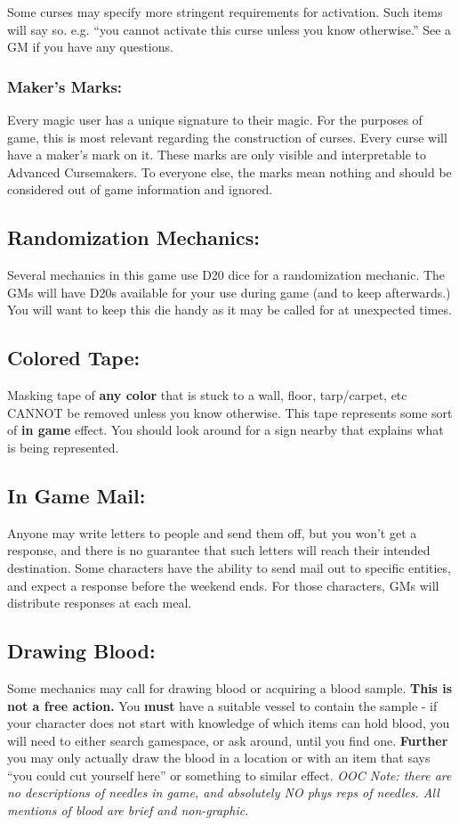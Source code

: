 \documentclass[sheet]{GL2020}
\begin{document}
{Some curses may specify more stringent requirements for activation. Such items will say so. e.g. ``you cannot activate this curse unless you know otherwise.'' See a GM if you have any questions.

\subsubsection{Maker's Marks:}
Every magic user has a unique signature to their magic. For the purposes of game, this is most relevant regarding the construction of curses. Every curse will have a maker's mark on it. These marks are only visible and interpretable to Advanced Cursemakers. To everyone else, the marks mean nothing and should be considered out of game information and ignored. 

\subsection{Randomization Mechanics:}
Several mechanics in this game use D20 dice for a randomization mechanic. The GMs will have D20s available for your use during game (and to keep afterwards.) You will want to keep this die handy as it may be called for at unexpected times.

\subsection{Colored Tape:}
Masking tape of \textbf{any color} that is stuck to a wall, floor, tarp/carpet, etc CANNOT be removed unless you know otherwise. This tape represents some sort of \textbf{in game} effect. You should look around for a sign nearby that explains what is being represented.

\subsection{In Game Mail:}
Anyone may write letters to people and send them off, but you won't get a response, and there is no guarantee that such letters will reach their intended destination. Some characters have the ability to send mail out to specific entities, and expect a response before the weekend ends. For those characters, GMs will distribute responses at each meal. 

\subsection{Drawing Blood:}
Some mechanics may call for drawing blood or acquiring a blood sample. \textbf{This is not a free action.} You \textbf{must} have a suitable vessel to contain the sample - if your character does not start with knowledge of which items can hold blood, you will need to either search gamespace, or ask around, until you find one. \textbf{Further} you may only actually draw the blood in a location or with an item that says ``you could cut yourself here'' or something to similar effect. \emph{OOC Note: there are no descriptions of needles in game, and absolutely NO phys reps of needles. All mentions of blood are brief and non-graphic.}

}
\end{document}
